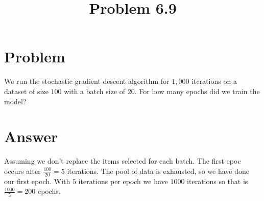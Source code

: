 \documentclass{article}
\title{Problem 6.9}
\begin{document}
\maketitle

\section{Problem}

We run the stochastic gradient descent algorithm for $1,000$ iterations on a dataset of size $100$ with a batch size of $20$. For how many epochs did we train the model?

\section{Answer}

Assuming we don't replace the items selected for each batch.
The first epoc occurs after $\frac{100}{20} = 5$ iterations.
The pool of data is exhausted, so we have done our first epoch.
With $5$ iterations per epoch we have $1000$ iterations so that is $ \frac{1000}{5} = 200$ epochs. 
\end{document}
